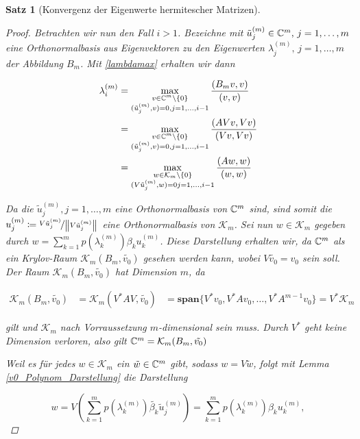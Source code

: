 \documentclass{article}
\theoremstyle{plain}
\newtheorem{theorem}    {Satz}   [section]
\begin{document}
\begin{theorem}[Konvergenz der Eigenwerte hermitescher Matrizen]
\begin{proof}
	Betrachten wir nun den Fall $i>1$.
	Bezeichne mit $\tilde{u}_j^{(m)} \in \mathbb{C}^m, \, j = 1,\dots, m$ eine Orthonormalbasis aus Eigenvektoren zu den Eigenwerten $\lambda_j^{(m)} , \, j = 1,\dots, m$ der Abbildung $B_m$. Mit \eqref{lambdamax} erhalten wir dann

	\begin{equation}
		\begin{aligned}
			\label{Darstellung EW}
			\lambda_i^{(m)} &= \max_{\substack{v\in \mathbb{C}^m\setminus \{0\} \\ (\tilde{u}_j^{(m)},v) = 0, j = 1,\dots,i-1}} \frac{(B_m v,v)}{(v,v)} \\
			&= \max_{\substack{v\in \mathbb{C}^m\setminus \{0\} \\ (\tilde{u}_j^{(m)},v) = 0, j = 1,\dots,i-1}} \frac{(AVv,Vv)}{(Vv,Vv)}\\
			&= \max_{\substack{w\in \mathcal{K}_m\setminus \{0\} \\ (V\tilde{u}_j^{(m)},w) = 0 j = 1,\dots,i-1}} \frac{(Aw,w)}{(w,w)}
		\end{aligned}
	\end{equation}

	Da die $\tilde{u}_j^{(m)}, j = 1,\dots,m$ eine Orthonormalbasis von $\mathbb{C}^m$ sind, sind somit die $u_j^{(m)} \coloneqq \nicefrac{V\tilde{u}_j^{(m)}}{{\left \| V\tilde{u}_j^{(m)} \right \|}_{}}$ eine Orthonormalbasis von $\mathcal{K}_m$. Sei nun $w\in \mathcal{K}_m$ gegeben durch $w = \sum_{k=1}^{m} p(\lambda_k^{(m)}) \beta_k u_k^{(m)}$. Diese Darstellung erhalten wir, da $\mathbb{C}^m$ als ein Krylov-Raum $\mathcal{K}_m (B_m, \tilde{v_0})$ gesehen werden kann, wobei $V \tilde{v_0} = v_0$ sein soll. Der Raum $\mathcal{K}_m (B_m, \tilde{v_0})$ hat Dimension $m$, da

	\begin{equation*}
		\begin{aligned}
			\mathcal{K}_m (B_m, \tilde{v_0}) &= \mathcal{K}_m (V^*AV, \tilde{v_0})
			&= \textbf{span}\{V^*v_0, V^*Av_0, \dots, V^*A^{m-1}v_0\} = V^* \mathcal{K}_m
		\end{aligned}
	\end{equation*}

	gilt und $\mathcal{K}_m$ nach Vorraussetzung $m$-dimensional sein muss. Durch $V^*$ geht keine Dimension verloren, also gilt $\mathbb{C}^m = \mathcal{K}_m (B_m, \tilde{v_0})$

	Weil es für jedes $w\in \mathcal{K}_m$ ein $\tilde{w} \in \mathbb{C}^m$ gibt, sodass $w = V \tilde{w}$, folgt mit Lemma \ref{v0_Polynom_Darstellung} die Darstellung

	\begin{equation*}
		w = V \left(\sum_{k=1}^{m} p(\lambda_k^{(m)}) \tilde{\beta_k} \tilde{u}_j^{(m)}\right) = \sum_{k=1}^{m} p(\lambda_k^{(m)}) \beta_k u_k^{(m)},
	\end{equation*}


\end{proof}
\end{theorem}
\end{document}
